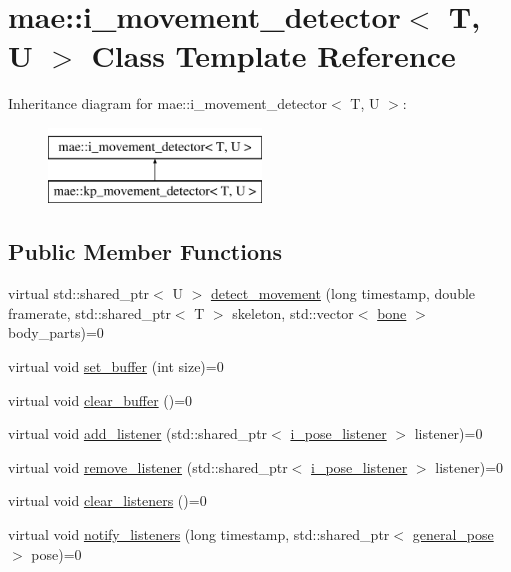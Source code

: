 \hypertarget{classmae_1_1i__movement__detector}{\section{mae\-:\-:i\-\_\-movement\-\_\-detector$<$ T, U $>$ Class Template Reference}
\label{classmae_1_1i__movement__detector}
}
Inheritance diagram for mae\-:\-:i\-\_\-movement\-\_\-detector$<$ T, U $>$\-:\begin{figure}[H]
\begin{center}
\leavevmode
\includegraphics[height=2.000000cm]{classmae_1_1i__movement__detector}
\end{center}
\end{figure}
\subsection*{Public Member Functions}
\begin{DoxyCompactItemize}
\item 
virtual std\-::shared\-\_\-ptr$<$ U $>$ \hyperlink{classmae_1_1i__movement__detector_a7b3e09f127d318b5f794e056e40b3746}{detect\-\_\-movement} (long timestamp, double framerate, std\-::shared\-\_\-ptr$<$ T $>$ skeleton, std\-::vector$<$ \hyperlink{classmae_1_1bone}{bone} $>$ body\-\_\-parts)=0
\item 
virtual void \hyperlink{classmae_1_1i__movement__detector_a96a923c5bab2dbed81daf4cadc885497}{set\-\_\-buffer} (int size)=0
\item 
virtual void \hyperlink{classmae_1_1i__movement__detector_a73db186e7b58daa0923f00b285671172}{clear\-\_\-buffer} ()=0
\item 
virtual void \hyperlink{classmae_1_1i__movement__detector_af6724fa4c8ddb032411825168e4b02d4}{add\-\_\-listener} (std\-::shared\-\_\-ptr$<$ \hyperlink{classmae_1_1i__pose__listener}{i\-\_\-pose\-\_\-listener} $>$ listener)=0
\item 
virtual void \hyperlink{classmae_1_1i__movement__detector_a88d965f2b8d04e0681e2e7cd42bd7331}{remove\-\_\-listener} (std\-::shared\-\_\-ptr$<$ \hyperlink{classmae_1_1i__pose__listener}{i\-\_\-pose\-\_\-listener} $>$ listener)=0
\item 
virtual void \hyperlink{classmae_1_1i__movement__detector_a56a36a8a427feb34f970b9e259a1150f}{clear\-\_\-listeners} ()=0
\item 
virtual void \hyperlink{classmae_1_1i__movement__detector_a347855d153525d7e09f793ff2b17b58b}{notify\-\_\-listeners} (long timestamp, std\-::shared\-\_\-ptr$<$ \hyperlink{classmae_1_1general__pose}{general\-\_\-pose} $>$ pose)=0
\end{DoxyCompactItemize}


